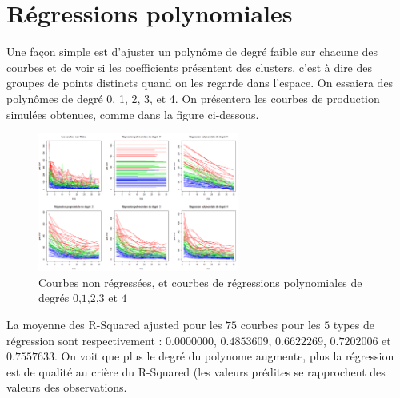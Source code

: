 \documentclass[12pt]{article}
\begin{document}
\small{
\tableofcontents 
}
\newpage


\section{R\'egressions polynomiales}
\label{sec:reg_pol}

Une fa\c con simple est d'ajuster un polyn\^ome de degr\'e faible sur chacune des courbes et
de voir si les coefficients pr\'esentent des clusters, c'est \`a dire des groupes de points distincts
quand on les regarde dans l'espace.
On essaiera des polyn\^omes de degr\'e 0, 1, 2, 3, et 4.
On pr\'esentera les courbes de production simul\'ees obtenues, comme dans la figure ci-dessous.

 
\begin{figure}[H]
 \centering %
	\includegraphics[width=250px]{reg_pol}
  \caption{\label{fig:polynomial_regressions} Courbes non r\'egress\'ees, et courbes de r\'egressions polynomiales de degr\'es $0$,$1$,$2$,$3$ et $4$}
\end{figure}

La moyenne des R-Squared ajusted pour les $75$ courbes pour les $5$ types de r\'egression sont respectivement : 
\newline
$0.0000000$, $0.4853609$, $0.6622269$, $0.7202006$ et $0.7557633$.
\newline
On voit que plus le degr\'e du polynome augmente, plus la r\'egression est de qualit\'e au cri\`ere du R-Squared (les valeurs pr\'edites se rapprochent des valeurs des observations.
\end{document}
